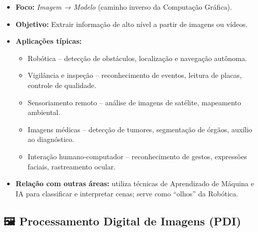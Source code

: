\documentclass[
  portuguese,
  letterpaper,
  openany,
  oneside,
  12pt,
  a4paper]{book}
\providecommand{\tightlist}{%
  \setlength{\itemsep}{0pt}\setlength{\parskip}{0pt}}
\begin{document}
\begin{itemize}
\tightlist
\item
  \textbf{Foco:} \emph{Imagem → Modelo} (caminho inverso da Computação
  Gráfica).\\
\item
  \textbf{Objetivo:} Extrair informação de alto nível a partir de
  imagens ou vídeos.\\
\item
  \textbf{Aplicações típicas:}

  \begin{itemize}
  \tightlist
  \item
    Robótica -- detecção de obstáculos, localização e navegação
    autônoma.
  \item
    Vigilância e inspeção -- reconhecimento de eventos, leitura de
    placas, controle de qualidade.
  \item
    Sensoriamento remoto -- análise de imagens de satélite, mapeamento
    ambiental.
  \item
    Imagens médicas -- detecção de tumores, segmentação de órgãos,
    auxílio ao diagnóstico.
  \item
    Interação humano‑computador -- reconhecimento de gestos, expressões
    faciais, rastreamento ocular.
  \end{itemize}
\item
  \textbf{Relação com outras áreas:} utiliza técnicas de Aprendizado de
  Máquina e IA para classificar e interpretar cenas; serve como
  ``olhos'' da Robótica.
\end{itemize}

\subsection{🖼️ Processamento Digital de Imagens
(PDI)}\label{processamento-digital-de-imagens-pdi}
\end{document}
